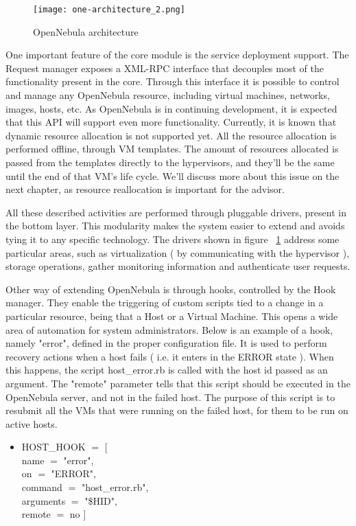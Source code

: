 \begin{figure}[ht]
  \centering
 \texttt{[image: one-architecture\_2.png]}
  \caption{OpenNebula architecture}
  \label{fig:open_arch}
\end{figure}

One important feature of the core module is the service deployment support. The Request manager exposes a XML-RPC interface that decouples most of the functionality present in the core. Through this interface it is possible to control and manage any OpenNebula resource, including virtual machines, networks, images, hosts, etc. As OpenNebula is in continuing development, it is expected that this API will support even more functionality. Currently, it is known that dynamic resource allocation is not supported yet. All the resource allocation is performed offline, through VM templates. The amount of resources allocated is passed from the templates directly to the hypervisors, and they'll be the same until the end of that VM's life cycle. We'll discuss more about this issue on the next chapter, as resource reallocation is important for the advisor.

All these described activities are performed through pluggable drivers, present in the bottom layer. This modularity makes the system easier to extend and avoids tying it to any specific technology. The drivers shown in figure ~\ref{fig:open_arch}  address some particular areas, such as virtualization ( by communicating with the hypervisor ), storage operations, gather monitoring information and authenticate user requests.

Other way of extending OpenNebula is through hooks, controlled by the Hook manager. They enable the triggering of custom scripts tied to a change in a particular resource, being that a Host or a Virtual Machine. This opens a wide area of automation for system administrators. Below is an example of a hook, namely "error", defined in the proper configuration file. It is used to perform recovery actions when a host fails ( i.e. it enters in the ERROR state ). When this happens, the script host\_error.rb is called with the host id passed as an argument. The "remote" parameter tells that this script should be executed in the OpenNebula server, and not in the failed host. The purpose of this script is to resubmit all the VMs that were running on the failed host, for them to be run on active hosts. 

\begin{itemize}
 \item HOST\_HOOK $=$ [ \\
    name      $=$ "error",\\
    on        $=$ "ERROR",\\
    command   $=$ "host\_error.rb",\\
    arguments $=$ "\$HID",\\
    remote    $=$ no ]\\
\end{itemize}

